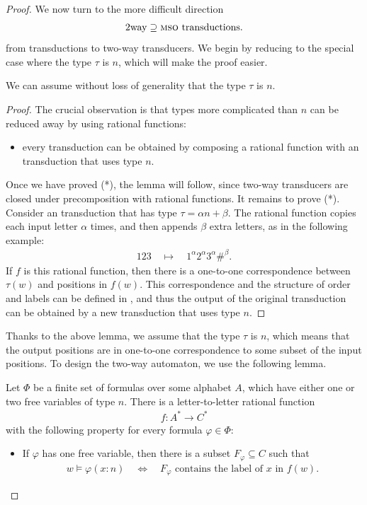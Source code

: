 \begin{proof}
    We now turn to the more difficult direction
    \begin{align*}
    \mathrm{2way} \supseteq {\textsc{mso}} \text{ transductions}.
    \end{align*} from \mso transductions to two-way transducers. We begin by reducing to the special case where the type $\tau$ is $n$, which will make the proof easier. 
    \begin{lemma}\label{lem:logic-reduction-to-type-n}
        We can assume without loss of generality that the type $\tau$ is $n$.
    \end{lemma}
    \begin{proof}
        The crucial observation is that types more complicated than $n$ can be reduced away by using rational functions:
        \begin{itemize}
            \item[(*)] every \mso transduction can be obtained by composing a rational function with an \mso transduction that uses type $n$.
        \end{itemize}
        Once we have proved (*), the lemma will follow, since two-way transducers are closed under precomposition with rational functions. It remains to prove (*). Consider an \mso transduction that has  type $\tau = \alpha n + \beta$. The rational function copies each input letter $\alpha$ times, and then appends $\beta$ extra letters, as in the following example:
\begin{align*}
123 \quad \mapsto \quad 1^\alpha 2^\alpha 3^\alpha \#^\beta.
\end{align*}
If $f$ is this rational function, then there is a one-to-one correspondence between $\tau(w)$ and positions in $f(w)$. This correspondence and the structure of order and labels can be defined in \mso, and thus the output of the original \mso transduction can be obtained by a new \mso transduction that uses type $n$.
    \end{proof}

    Thanks to the above lemma, we assume that the type $\tau$ is $n$, which means that the output positions are in one-to-one correspondence to some subset of  the input positions. To design the two-way automaton, we use the following lemma. 
    \begin{lemma}\label{lem:logic-precomputation}
        Let $\Phi$ be a finite set of \mso formulas over some alphabet $A$, which have either one or two free variables of type $n$.  There is a letter-to-letter rational function 
        \begin{align*}
        f : A^* \to C^*
        \end{align*}
        with the following property for every formula $\varphi \in \Phi$: 
        \begin{itemize}
            \item If   $\varphi$  has one free variable, then there is a subset $F_\varphi \subseteq C$ such that  
            \begin{align*}
            w \models \varphi(x: n) \quad \iff \quad \text{$F_\varphi$ contains the label of $x$ in $f(w)$}.
            \end{align*}


\end{itemize}
\end{lemma}
\end{proof}
